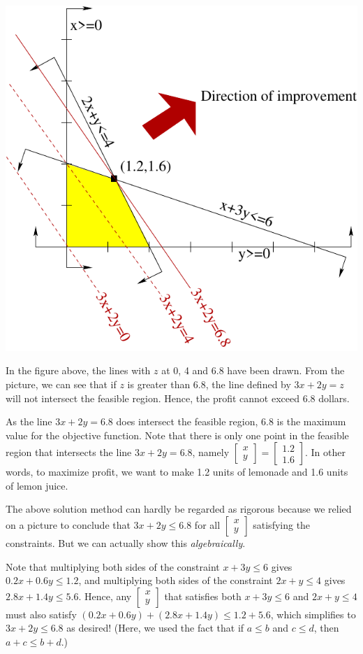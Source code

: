 \documentclass[]{book}
\theoremstyle{definition}
\theoremstyle{definition}
\theoremstyle{remark}
\begin{document}
\begin{center}\includegraphics[width=0.8\linewidth]{images/lemon} \end{center}

In the figure above, the lines with \(z\) at 0, 4 and 6.8 have been
drawn. From the picture, we can see that if \(z\) is greater than 6.8,
the line defined by \(3x+2y = z\) will not intersect the feasible
region. Hence, the profit cannot exceed 6.8 dollars.

As the line \(3x+2y = 6.8\) does intersect the feasible region, \(6.8\)
is the maximum value for the objective function. Note that there is only
one point in the feasible region that intersects the line \(3x+2y=6.8\),
namely
\(\begin{bmatrix} x \\ y\end{bmatrix} = \begin{bmatrix} 1.2 \\ 1.6\end{bmatrix}.\)
In other words, to maximize profit, we want to make 1.2 units of
lemonade and 1.6 units of lemon juice.

The above solution method can hardly be regarded as rigorous because we
relied on a picture to conclude that \(3x + 2y \leq 6.8\) for all
\(\begin{bmatrix} x\\y\end{bmatrix}\) satisfying the constraints. But we
can actually show this \emph{algebraically}.

Note that multiplying both sides of the constraint \(x + 3y \leq 6\)
gives \(0.2x + 0.6 y \leq 1.2\), and multiplying both sides of the
constraint \(2x + y \leq 4\) gives \(2.8x + 1.4 y \leq 5.6\). Hence, any
\(\begin{bmatrix} x\\y\end{bmatrix}\) that satisfies both \(x+3y\leq 6\)
and \(2x+y \leq 4\) must also satisfy
\((0.2x+0.6y) + (2.8x+1.4y) \leq 1.2 + 5.6\), which simplifies to
\(3x + 2y \leq 6.8\) as desired! (Here, we used the fact that if
\(a \leq b\) and \(c \leq d\), then \(a+c \leq b+d\).)
\end{document}
